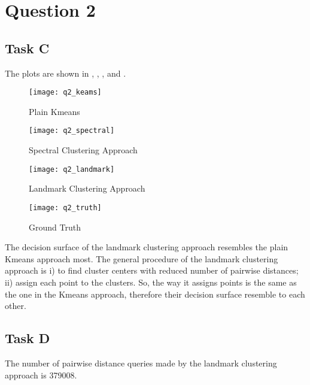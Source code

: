 \documentclass{article}
\begin{document}
\section*{Question 2}

\subsection*{Task C}

  The plots are shown in , , , and .

  \begin{figure}[!ht]
    \begin{minipage}{.45\textwidth}
      \centering
      \texttt{[image: q2\_keams]}
      \caption{Plain Kmeans}
      \label{fig:q2a}
    \end{minipage}
    \hfill
    \begin{minipage}{.45\textwidth}
      \centering
      \texttt{[image: q2\_spectral]}
      \caption{Spectral Clustering Approach}
      \label{fig:q2b}
    \end{minipage}
    \vfill
    \begin{minipage}{.45\textwidth}
      \centering
      \texttt{[image: q2\_landmark]}
      \caption{Landmark Clustering Approach}
      \label{fig:q2c}
    \end{minipage}
    \hfill
    \begin{minipage}{.45\textwidth}
      \centering
      \texttt{[image: q2\_truth]}
      \caption{Ground Truth}
      \label{fig:q2d}
    \end{minipage}
  \end{figure}

  The decision surface of the landmark clustering approach resembles the plain Kmeans approach most. The general procedure of the landmark clustering approach is i) to find cluster centers with reduced number of pairwise distances; ii) assign each point to the clusters. So, the way it assigns points is the same as the one in the Kmeans approach, therefore their decision surface resemble to each other.

\subsection*{Task D}

  The number of pairwise distance queries made by the landmark clustering approach is 379008.
\end{document}
